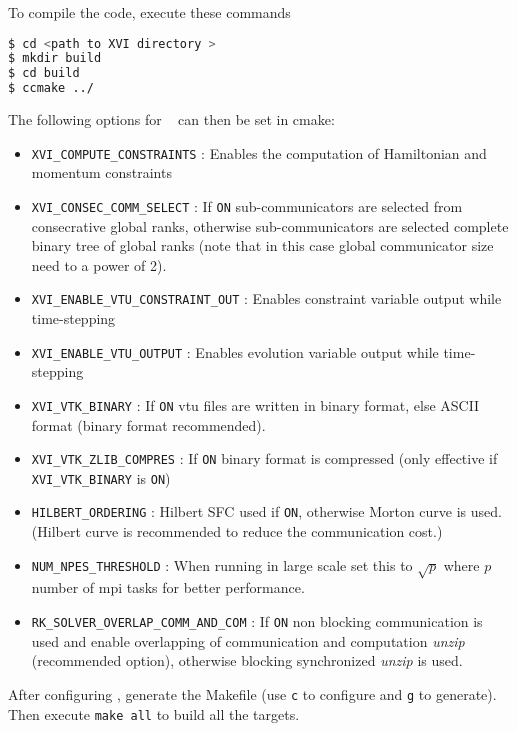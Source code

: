 To compile the code, execute these commands
\begin{lstlisting}[language=bash]
$ cd <path to XVI directory >
$ mkdir build
$ cd build
$ ccmake ../      
\end{lstlisting}
The following options for \dendrokt~   can then be set in cmake:
\begin{itemize}
	\item \texttt{XVI\_COMPUTE\_CONSTRAINTS} : Enables the computation of Hamiltonian and momentum constraints
	\item \texttt{XVI\_CONSEC\_COMM\_SELECT}  : If \texttt{ON} sub-communicators are selected from consecrative global ranks, otherwise sub-communicators are selected complete binary tree of global ranks (note that in this case global communicator size need to a power of 2).
	\item \texttt{XVI\_ENABLE\_VTU\_CONSTRAINT\_OUT} : Enables constraint variable output while time-stepping 
	\item \texttt{XVI\_ENABLE\_VTU\_OUTPUT} : Enables evolution variable output while time-stepping
	\item \texttt{XVI\_VTK\_BINARY} : If \texttt{ON} vtu files are written in binary format, else ASCII format (binary format recommended).
	\item \texttt{XVI\_VTK\_ZLIB\_COMPRES} : If \texttt{ON} binary format is compressed (only effective if \texttt{XVI\_VTK\_BINARY} is \texttt{ON})
	\item \texttt{HILBERT\_ORDERING} : Hilbert SFC used if \texttt{ON}, otherwise Morton curve is used. (Hilbert curve is recommended to reduce the communication cost.)
	\item \texttt{NUM\_NPES\_THRESHOLD} : When running in large scale set this to $\sqrt{p}$ where $p$ number of mpi tasks for better performance.
	\item \texttt{RK\_SOLVER\_OVERLAP\_COMM\_AND\_COM} : If \texttt{ON} non blocking communication is used and enable overlapping of communication and computation \textit{unzip} (recommended option), otherwise blocking synchronized \textit{unzip} is used.  	
\end{itemize}

After configuring \dendrokt, generate the Makefile (use \texttt{c} to configure and \texttt{g} to generate). Then execute \texttt{make all} to build all the targets.


